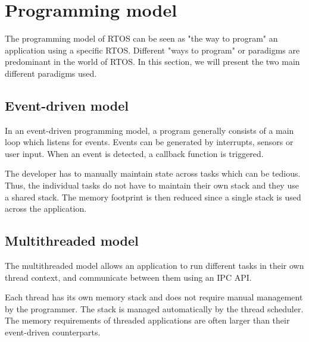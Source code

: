 \section{Programming model}
The programming model of RTOS can be seen as "the way to program" an application using a specific RTOS.
Different "ways to program" or paradigms are predominant in the world of RTOS.
In this section, we will present the two main different paradigms used\cite{comparison_iot_constrained_devices}.


\subsection{Event-driven model}
In an event-driven programming model, a program generally consists of a main loop which listens for events.
Events can be generated by interrupts, sensors or user input.
When an event is detected, a callback function is triggered.

The developer has to manually maintain state across tasks which can be tedious.
Thus, the individual tasks do not have to maintain their own stack and they use a shared stack.
The memory footprint is then reduced since a single stack is used across the application.

\subsection{Multithreaded model}
The multithreaded model allows an application to run different tasks in their own thread context,
    and communicate between them using an IPC API.

Each thread has its own memory stack and does not require manual management by the programmer.
The stack is managed automatically by the thread scheduler.
The memory requirements of threaded applications are often larger than their event-driven counterparts.